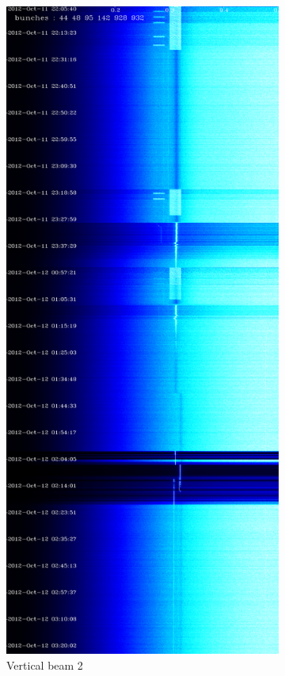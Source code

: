 \begin{figure}[H]
\centering
\begin{subfigure}{.5\textwidth}
  \centering
  \includegraphics[width=.8\linewidth]{md-121011-vb2-bunches111111-16.png}
  \caption{Vertical beam 2}
\end{subfigure}%
\begin{subfigure}{.5\textwidth}

\end{subfigure}
\end{figure}

